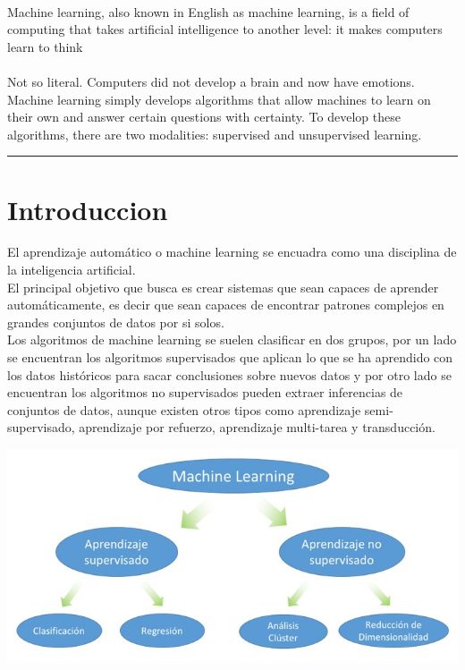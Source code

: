 \documentclass[11pt,a4paper]{article}
\begin{document}
		 \\Machine learning, also known in English as machine learning, is a field of computing that takes artificial intelligence to another level: it makes computers learn to think\\
		 
		 \\Not so literal. Computers did not develop a brain and now have emotions. Machine learning simply develops algorithms that allow machines to learn on their own and answer certain questions with certainty. To develop these algorithms, there are two modalities: supervised and unsupervised learning.\\
				
		\vspace{\baselineskip}
					
		\rule{167mm}{0.1mm}
		
		\vspace{\baselineskip}
		
		\section{Introduccion}
		
		El aprendizaje automático o machine learning se encuadra como una disciplina de la inteligencia artificial.\\

        El principal objetivo que busca es crear sistemas que sean capaces de aprender automáticamente, es decir que sean capaces de encontrar patrones complejos en grandes conjuntos de datos por si solos.\\

        Los algoritmos de machine learning se suelen clasificar en dos grupos, por un lado se encuentran los algoritmos supervisados que aplican lo que se ha aprendido con los datos históricos para sacar conclusiones sobre nuevos datos y por otro lado se encuentran los algoritmos no supervisados pueden extraer inferencias de conjuntos de datos, aunque existen otros tipos como aprendizaje semi-supervisado, aprendizaje por refuerzo, aprendizaje multi-tarea y transducción.\\
		
		\begin{center}
		\includegraphics[scale=0.5]{./Imagenes/MachineLearning}
		\end{center}
		
\end{document}
